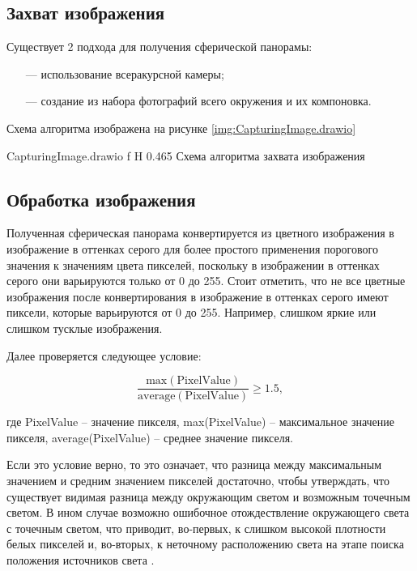 \subsection{Захват изображения}

Существует 2 подхода для получения сферической панорамы:

\begin{enumerate}
	\item[---] использование всеракурсной камеры;
	\item[---] создание из набора фотографий всего окружения и их компоновка.
\end{enumerate}

Схема алгоритма изображена на рисунке \ref{img:CapturingImage.drawio}

{CapturingImage.drawio}
{f}
{H}
{0.465\textwidth}
{Схема алгоритма захвата изображения}

\subsection{Обработка изображения}

Полученная сферическая панорама конвертируется из цветного изображения в изображение в оттенках серого для более простого применения порогового значения к значениям цвета пикселей, поскольку в изображении в оттенках серого они варьируются только от 0 до 255. Стоит отметить, что не все цветные изображения после конвертирования в изображение в оттенках серого имеют пиксели, которые варьируются от 0 до 255. Например, слишком яркие или слишком тусклые изображения.

Далее проверяется следующее условие:

\begin{equation}
	\frac{\text{max}(\text{PixelValue})}{\text{average}(\text{PixelValue})} \geqslant 1.5,
\end{equation}

где PixelValue -- значение пикселя, max(PixelValue) -- максимальное значение пикселя, average(PixelValue) -- среднее значение пикселя.

Если это условие верно, то это означает, что разница между максимальным значением и средним значением пикселей достаточно, чтобы утверждать, что существует видимая разница между окружающим светом и возможным точечным светом. В ином случае возможно ошибочное отождествление окружающего света с точечным светом, что приводит, во-первых, к слишком высокой плотности белых пикселей и, во-вторых, к неточному расположению света на этапе поиска положения источников света \cite{osti2019real}.


